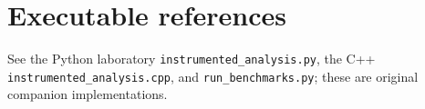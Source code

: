 \documentclass[11pt]{article}
\begin{document}
\section{Executable references}
See the Python laboratory \texttt{instrumented\_analysis.py}, the C++ \texttt{instrumented\_analysis.cpp}, and \texttt{run\_benchmarks.py}; these are original companion implementations.
\end{document}
